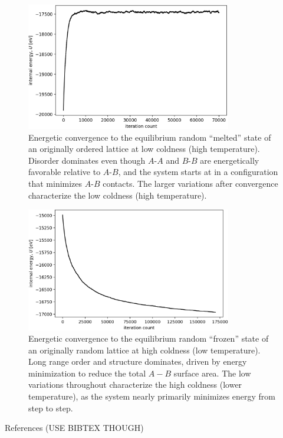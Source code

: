 \documentclass[10pt]{article}
\begin{document}
\begin{figure}[h!]
\centering
\includegraphics[width=0.80\textwidth]{Figures/verification_melted_convergence.png}
\caption{Energetic convergence to the equilibrium random ``melted'' state of an originally ordered lattice at low coldness (high temperature).
Disorder dominates even though $A$-$A$ and $B$-$B$ are energetically favorable relative to $A$-$B$, and the system starts at in a configuration that minimizes $A$-$B$ contacts.
The larger variations after convergence characterize the low coldness (high temperature).}
\label{fig:melted_convergence}
\end{figure}

\begin{figure}[h!]
\centering
\includegraphics[width=0.80\textwidth]{Figures/verification_frozen_convergence.png}
\caption{Energetic convergence to the equilibrium random ``frozen'' state of an originally random lattice at high coldness (low temperature).
Long range order and structure dominates, driven by energy minimization to reduce the total $A-B$ surface area.
The low variations throughout characterize the high coldness (lower temperature), as the system nearly primarily minimizes energy from step to step.}
\label{fig:frozen_convergence}
\end{figure}


\clearpage

References (USE BIBTEX THOUGH)
\end{document}

